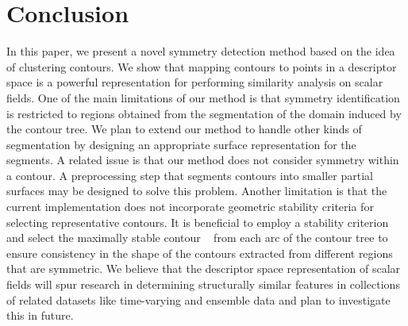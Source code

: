 \documentclass[review,journal]{vgtc}         %
\begin{document}
\section{Conclusion}
In this paper, we present a novel symmetry detection method based on the idea of clustering contours.
We show that mapping contours to points in a descriptor space is a powerful representation for
performing similarity analysis on scalar fields. One of the main limitations of our method is that
symmetry identification is restricted to regions obtained from the segmentation of the domain induced
by the contour tree. We plan to extend our method to handle other kinds of segmentation by designing
an appropriate surface representation for the segments. A related issue is that our method does not 
consider symmetry within a contour. A preprocessing step that segments contours into smaller partial
surfaces may be designed to solve this problem. Another limitation is that the current implementation
does not incorporate geometric stability criteria for selecting representative contours. 
It is beneficial to employ a stability criterion and select the maximally stable contour 
~\cite{MatasCUP04} from each arc of the contour tree to ensure consistency
in the shape of the contours extracted from different regions that are symmetric.
We believe
that the descriptor space representation of scalar fields will spur research in determining structurally
similar features in collections of related datasets like time-varying and ensemble data and plan to 
investigate this in future.
%
%
%
%
%
\end{document}
